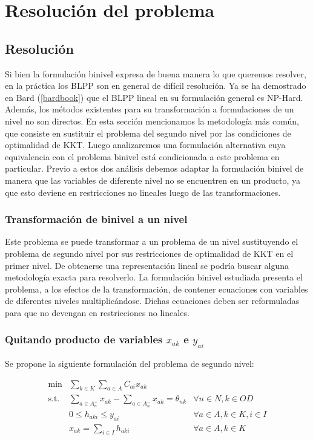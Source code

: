 \documentclass{article}
\begin{document}
  \section{Resolución del problema}

  \subsection{Resolución}

  Si bien la formulación binivel expresa de buena manera lo que queremos resolver, en la práctica los BLPP son en general de difícil resolución. Ya se ha demostrado en Bard (\ref{bardbook}) que el BLPP lineal en su formulación general es NP-Hard. Además, los métodos existentes para su transformación a formulaciones de un nivel no son directos. En esta sección mencionamos la metodología más común, que consiste en sustituir el problema del segundo nivel por las condiciones de optimalidad de KKT. Luego analizaremos una formulación alternativa cuya equivalencia con el problema binivel está condicionada a este problema en particular. Previo a estos dos análisis debemos adaptar la formulación binivel de manera que las variables de diferente nivel no se encuentren en un producto, ya que esto deviene en restricciones no lineales luego de las transformaciones.

  \subsubsection{Transformación de binivel a un nivel}

  Este problema se puede transformar a un problema de un nivel sustituyendo el problema de segundo nivel por sus restricciones de optimalidad de KKT en el primer nivel. De obtenerse una representación lineal se podría buscar alguna metodología exacta para resolverlo. La formulación binivel estudiada presenta el problema, a los efectos de la transformación, de contener ecuaciones con variables de diferentes niveles multiplicándose. Dichas ecuaciones deben ser reformuladas para que no devengan en restricciones no lineales.

  \subsubsection{Quitando producto de variables $x_{ak}$ e $y_{ai}$}

  Se propone la siguiente formulación del problema de segundo nivel:

  \begin{align}
    \text{min}  & \sum_{k \in K} \sum_{a \in A} C_{ai} x_{ak}         & \label{eq:subproblemrefeq1} \\
    \text{s.t.} & \sum_{a \in A_n^+} x_{ak} - \sum_{a \in A_n^-} x_{ak} = \theta_{nk} & \forall n \in N, k \in OD \\
                & 0 \leq h_{aki} \leq y_{ai}                                          & \forall a \in A, k \in K, i \in I \\
                & x_{ak} = \sum_{i \in I} h_{aki}                                     & \forall a \in A, k \in K
  \end{align}
\end{document}
